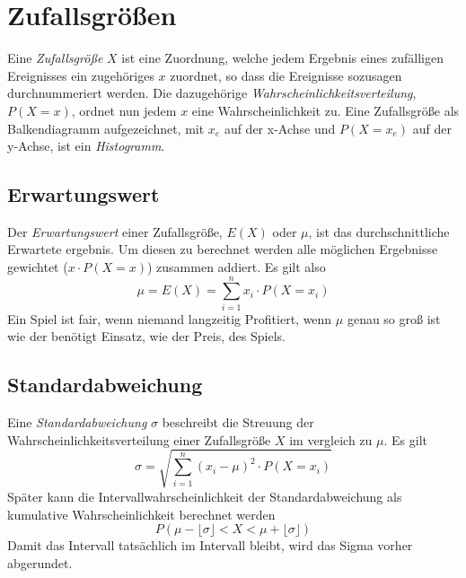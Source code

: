 \documentclass{article}
\begin{document}
\section{Zufallsgrößen} 
Eine \emph{Zufallsgröße} $X$ ist eine Zuordnung, welche jedem Ergebnis eines zufälligen Ereignisses ein zugehöriges $x$ zuordnet, so dass die Ereignisse sozusagen durchnummeriert werden. Die dazugehörige \emph{Wahrscheinlichkeitsverteilung}, $P(X=x)$, ordnet nun jedem $x$ eine Wahrscheinlichkeit zu. \newline
Eine Zufallsgröße als Balkendiagramm aufgezeichnet, mit $x_e$ auf der x-Achse und $P(X=x_e)$ auf der y-Achse, ist ein \emph{Histogramm}.
 
\subsection{Erwartungswert}
Der \emph{Erwartungswert} einer Zufallsgröße, $E(X)$ oder $\mu$, ist das durchschnittliche Erwartete ergebnis. Um diesen zu berechnet werden alle möglichen Ergebnisse gewichtet ($x \cdot P(X=x)$) zusammen addiert. Es gilt also
\[
 \mu = E(X) = \sum_{i=1}^n x_i \cdot P(X=x_i) 
\]  
Ein Spiel ist fair, wenn niemand langzeitig Profitiert, wenn $\mu$ genau so groß ist wie der benötigt Einsatz, wie der Preis, des Spiels.
 
\subsection{Standardabweichung}
Eine \emph{Standardabweichung} $\sigma$ beschreibt die Streuung der Wahrscheinlichkeitsverteilung einer Zufallsgröße $X$ im vergleich zu $\mu$. Es gilt
\[
 \sigma = \sqrt{\sum_{i=1}^n (x_i - \mu)^2 \cdot P(X=x_i)}
\]
Später kann die Intervallwahrscheinlichkeit der Standardabweichung als kumulative Wahrscheinlichkeit berechnet werden
\[
 P(\mu-\lfloor\sigma\rfloor < X <\mu+\lfloor\sigma\rfloor) 
\]
Damit das Intervall tatsächlich im Intervall bleibt, wird das Sigma vorher abgerundet. 
 
\end{document}
